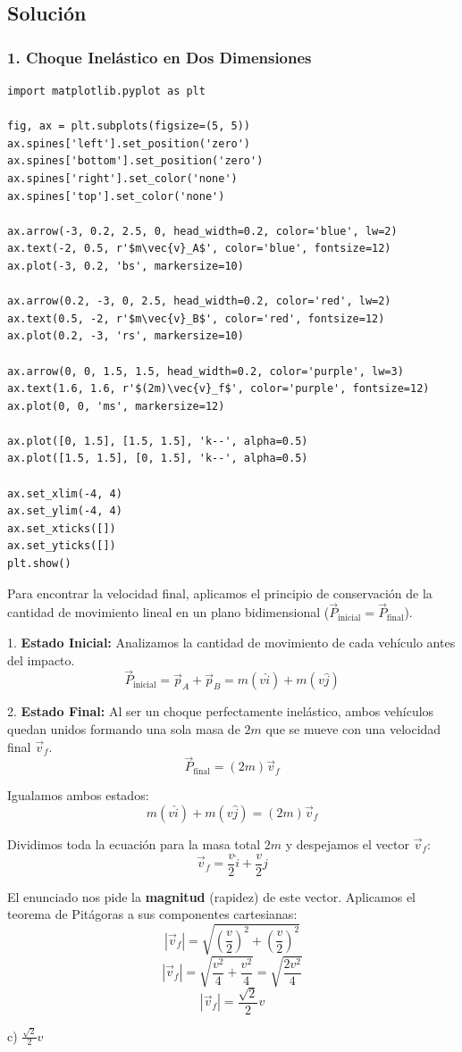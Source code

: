 \documentclass[12pt, a4paper]{article}
\begin{document}
\subsection*{Solución}

\subsubsection*{1. Choque Inelástico en Dos Dimensiones}

\begin{verbatim}
import matplotlib.pyplot as plt

fig, ax = plt.subplots(figsize=(5, 5))
ax.spines['left'].set_position('zero')
ax.spines['bottom'].set_position('zero')
ax.spines['right'].set_color('none')
ax.spines['top'].set_color('none')

ax.arrow(-3, 0.2, 2.5, 0, head_width=0.2, color='blue', lw=2)
ax.text(-2, 0.5, r'$m\vec{v}_A$', color='blue', fontsize=12)
ax.plot(-3, 0.2, 'bs', markersize=10)

ax.arrow(0.2, -3, 0, 2.5, head_width=0.2, color='red', lw=2)
ax.text(0.5, -2, r'$m\vec{v}_B$', color='red', fontsize=12)
ax.plot(0.2, -3, 'rs', markersize=10)

ax.arrow(0, 0, 1.5, 1.5, head_width=0.2, color='purple', lw=3)
ax.text(1.6, 1.6, r'$(2m)\vec{v}_f$', color='purple', fontsize=12)
ax.plot(0, 0, 'ms', markersize=12)

ax.plot([0, 1.5], [1.5, 1.5], 'k--', alpha=0.5)
ax.plot([1.5, 1.5], [0, 1.5], 'k--', alpha=0.5)

ax.set_xlim(-4, 4)
ax.set_ylim(-4, 4)
ax.set_xticks([])
ax.set_yticks([])
plt.show()
\end{verbatim}

Para encontrar la velocidad final, aplicamos el principio de conservación de la cantidad de movimiento lineal en un plano bidimensional ($\vec{P}_{\text{inicial}} = \vec{P}_{\text{final}}$).

1. \textbf{Estado Inicial:} Analizamos la cantidad de movimiento de cada vehículo antes del impacto.
$$ \vec{P}_{\text{inicial}} = \vec{p}_A + \vec{p}_B = m(v\hat{i}) + m(v\hat{j}) $$

2. \textbf{Estado Final:} Al ser un choque perfectamente inelástico, ambos vehículos quedan unidos formando una sola masa de $2m$ que se mueve con una velocidad final $\vec{v}_f$.
$$ \vec{P}_{\text{final}} = (2m)\vec{v}_f $$

Igualamos ambos estados:
$$ m(v\hat{i}) + m(v\hat{j}) = (2m)\vec{v}_f $$

Dividimos toda la ecuación para la masa total $2m$ y despejamos el vector $\vec{v}_f$:
$$ \vec{v}_f = \frac{v}{2}\hat{i} + \frac{v}{2}\hat{j} $$

El enunciado nos pide la \textbf{magnitud} (rapidez) de este vector. Aplicamos el teorema de Pitágoras a sus componentes cartesianas:
$$ |\vec{v}_f| = \sqrt{\left(\frac{v}{2}\right)^2 + \left(\frac{v}{2}\right)^2} $$
$$ |\vec{v}_f| = \sqrt{\frac{v^2}{4} + \frac{v^2}{4}} = \sqrt{\frac{2v^2}{4}} $$
$$ |\vec{v}_f| = \frac{\sqrt{2}}{2}v $$

\begin{tcolorbox}[colback=green!5!white, colframe=green!50!black, title=Respuesta Final]
\centering \Large c) $\frac{\sqrt{2}}{2}v$
\end{tcolorbox}
\end{document}

